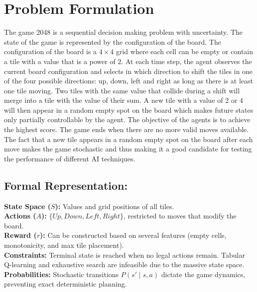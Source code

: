 \documentclass[letterpaper]{article} %
\begin{document}
\section{Problem Formulation}
The game 2048 is a sequential decision making problem with uncertainty.
The state of the game is represented by the configuration of the board.
The configuration of the board is a $4\times4$ grid where each cell can be empty or contain a tile with a value that is a power of 2.
At each time step, the agent observes the current board configuration and selects in which direction to shift the tiles in one of the four 
possible directions: up, down, left and right as long as there is at least one tile moving.
Two tiles with the same value that collide during a shift will merge into a tile with the value of their sum.
A new tile with a value of 2 or 4 will then appear in a random empty spot on the board which makes future states only partially controllable by the agent.
The objective of the agents is to achieve the highest score. The game ends when there are no more valid moves available.
The fact that a new tile appears in a random empty spot on the board after each move makes the game stochastic and thus making it a good candidate for
testing the performance of different AI techniques.




\subsection{Formal Representation:}
\textbf{State Space ($S$):} Values and grid positions of all tiles. \\
\textbf{Actions ($A$):} $\{Up, Down, Left, Right\}$, restricted to moves that modify the board. \\
\textbf{Reward ($r$):} Can be constructed based on several features (empty cells, monotonicity, and max tile placement). \\
\textbf{Constraints:} Terminal state is reached when no legal actions remain. Tabular Q-learning and exhaustive search are infeasible due to the massive state space. \\
\textbf{Probabilities:} Stochastic transitions $P(s' \mid s, a)$ dictate the game dynamics, preventing exact deterministic planning. 
\end{document}
